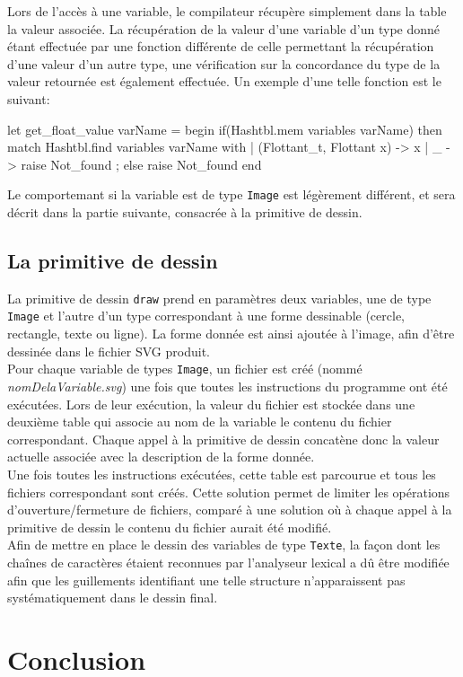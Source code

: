 \documentclass[a4paper, 12pt]{report}
\begin{document}
	Lors de l'accès à une variable, le compilateur récupère simplement dans la table la valeur associée. La récupération de la valeur d'une variable d'un type donné étant effectuée par une fonction différente de celle permettant la récupération d'une valeur d'un autre type, une vérification sur la concordance du type de la valeur retournée est également effectuée. Un exemple d'une telle fonction est le suivant:
	
\begin{verbatimtab}[4]
	let get_float_value varName =
	begin
		if(Hashtbl.mem variables varName)
		then
			match Hashtbl.find variables varName with
				|	(Flottant_t, Flottant x)	->	x
				|	_				->	raise Not_found
				;
		else
				raise Not_found
	end
\end{verbatimtab}

	Le comportemant si la variable est de type \texttt{Image} est légèrement différent, et sera décrit dans la partie suivante, consacrée à la primitive de dessin.

	\section{La primitive de dessin}
	
	La primitive de dessin \texttt{draw} prend en paramètres deux variables, une de type \texttt{Image} et l'autre d'un type correspondant à une forme dessinable (cercle, rectangle, texte ou ligne). La forme donnée est ainsi ajoutée à l'image, afin d'être dessinée dans le fichier SVG produit.\\
	
	Pour chaque variable de types \texttt{Image}, un fichier est créé (nommé \textit{nomDelaVariable.svg}) une fois que toutes les instructions du programme ont été exécutées. Lors de leur exécution, la valeur du fichier est stockée dans une deuxième table qui associe au nom de la variable le contenu du fichier correspondant. Chaque appel à la primitive de dessin concatène donc la valeur actuelle associée avec la description de la forme donnée.\\
	
	Une fois toutes les instructions exécutées, cette table est parcourue et tous les fichiers correspondant sont créés. Cette solution permet de limiter les opérations d'ouverture/fermeture de fichiers, comparé à une solution où à chaque appel à la primitive de dessin le contenu du fichier aurait été modifié.\\
	
	Afin de mettre en place le dessin des variables de type \texttt{Texte}, la façon dont les chaînes de caractères étaient reconnues par l'analyseur lexical a dû être modifiée afin que les guillements identifiant une telle structure n'apparaissent pas systématiquement dans le dessin final.

\chapter{Conclusion}
\end{document}
